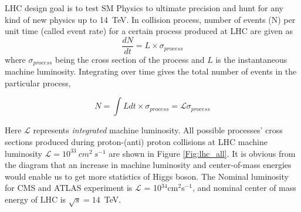 \par
LHC design goal is to test SM Physics to ultimate precision and hunt for any kind of new physics up to 14~TeV. In collision process, number of events (N) per unit time (called event rate) for a certain process produced at LHC are given as 
\begin{equation}
	\frac{dN}{dt} = L \times \sigma_{process} %
\end{equation}
where $\sigma_{process}$ being the cross section of the process and $L$ is the instantaneous machine luminosity. Integrating over time gives the total number of events in the particular process,

\begin{equation}
	N = \int{Ldt} \times \sigma_{process} = \mathscr{L}\sigma_{process}
\end{equation}

Here $\mathscr{L}$ represents \textit{integrated} machine luminosity. All possible processes' cross sections produced during proton-(anti) proton collisions at LHC machine luminosity $\mathscr{L} = 10^{33}~cm^{2}~s^{-1}$ are shown in Figure \ref{Fig:lhc_all}. 
It is obvious from the diagram that an increase in  machine luminosity and center-of-mass energies would enable us to get more statistics of Higgs boson. The Nominal luminosity for CMS and ATLAS experiment is $\mathscr{L}$ = 10$^{34}$cm$^{2}$s$^{-1}$, and nominal center of mass energy of LHC is $\sqrt{s} = 14$~TeV. 

